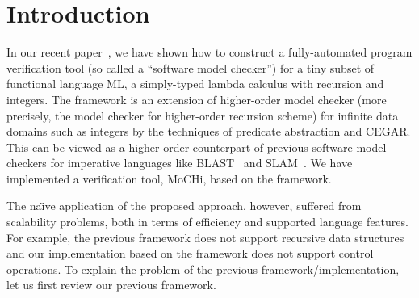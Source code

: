 \section{Introduction}
\label{sec:intro}

In our recent paper~\cite{KobayashiPLDI2011}, we have shown how to
construct a fully-automated program verification tool (so called a
``software model checker'') for a tiny subset of functional language ML, a
simply-typed lambda calculus with recursion and integers.
The framework is an extension of higher-order model checker
(more precisely, the model checker for higher-order recursion scheme)
for infinite data domains such as integers by the techniques of
predicate abstraction and CEGAR.  This can be viewed as a higher-order
counterpart of previous software model checkers for imperative languages
like BLAST~\cite{Henzinger2002} and SLAM~\cite{Ball2002}.
We have implemented a verification tool, MoCHi, based on the framework.

The na\"{\i}ve application of the proposed approach, however, suffered
from scalability problems, both in terms of efficiency and supported
language features. For example, the previous framework does not support
recursive data structures and our implementation based on the framework
does not support control operations.  To explain the problem of the
previous framework/implementation, let us first review our previous
framework.

